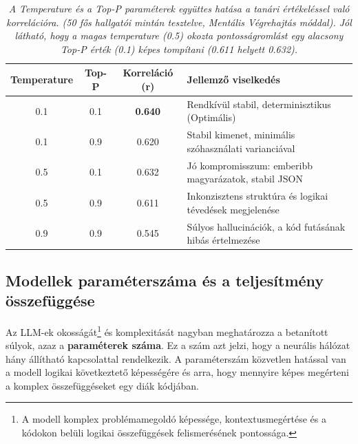\documentclass[12pt,a4paper]{article}
\begin{document}
\begin{table}[H]
    \centering
    \begin{tabular}{|c|c|c|p{7.5cm}|}
        \hline
        \textbf{Temperature} & \textbf{Top-P} & \textbf{Korreláció (r)} & \textbf{Jellemző viselkedés} \\
        \hline
        0.1 & 0.1 & \textbf{0.640} & Rendkívül stabil, determinisztikus (Optimális) \\
        \hline
        0.1 & 0.9 & 0.620 & Stabil kimenet, minimális szóhasználati varianciával \\
        \hline
        0.5 & 0.1 & 0.632 & Jó kompromisszum: emberibb magyarázatok, stabil JSON \\
        \hline
        0.5 & 0.9 & 0.611 & Inkonzisztens struktúra és logikai tévedések megjelenése \\
        \hline
        0.9 & 0.9 & 0.545 & Súlyos hallucinációk, a kód futásának hibás értelmezése \\
        \hline
    \end{tabular}
    \vspace{0.2cm}
    \caption{\textit{A Temperature és a Top-P paraméterek együttes hatása a tanári értékeléssel való korrelációra. (50 fős hallgatói mintán tesztelve, Mentális Végrehajtás móddal). Jól látható, hogy a magas temperature (0.5) okozta pontosságromlást egy alacsony Top-P érték (0.1) képes tompítani (0.611 helyett 0.632).}}
    \label{tab:temp_topp}
\end{table}

\subsection{Modellek paraméterszáma és a teljesítmény összefüggése}
\label{sec:parameterek}
Az LLM-ek okosságát\footnote{A modell komplex problémamegoldó képessége, kontextusmegértése és a kódokon belüli logikai összefüggések felismerésének pontossága.} és komplexitását nagyban meghatározza a betanított súlyok, azaz a \textbf{paraméterek száma}. Ez a szám azt jelzi, hogy a neurális hálózat hány állítható kapcsolattal rendelkezik. A paraméterszám közvetlen hatással van a modell logikai következtető képességére és arra, hogy mennyire képes megérteni a komplex összefüggéseket egy diák kódjában.
\end{document}
